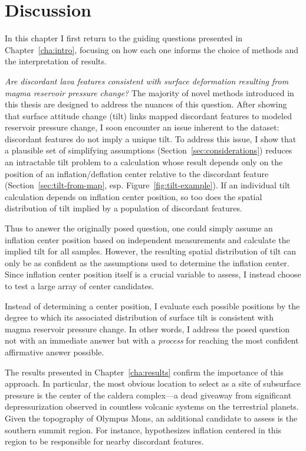 \chapter{Discussion}\label{cha:discussion}

In this chapter I first return to the guiding questions presented in Chapter~\ref{cha:intro}, focusing on how each one informs the choice of methods and the interpretation of results.

\emph{Are discordant lava features consistent with surface deformation resulting from magma reservoir pressure change?} The majority of novel methods introduced in this thesis are designed to address the nuances of this question. After showing that surface attitude change (tilt) links mapped discordant features to modeled reservoir pressure change, I soon encounter an issue inherent to the dataset: discordant features do not imply a unique tilt. To address this issue, I show that a plausible set of simplifying assumptions (Section~\ref{sec:considerations}) reduces an intractable tilt problem to a calculation whose result depends only on the position of an inflation/deflation center relative to the discordant feature (Section~\ref{sec:tilt-from-map}, esp. Figure~\ref{fig:tilt-example}). If an individual tilt calculation depends on inflation center position, so too does the spatial distribution of tilt implied by a population of discordant features.

Thus to answer the originally posed question, one could simply assume an inflation center position based on independent measurements and calculate the implied tilt for all samples. However, the resulting spatial distribution of tilt can only be as confident as the assumptions used to determine the inflation center. Since inflation center position itself is a crucial variable to assess, I instead choose to test a large array of center candidates. 

Instead of determining a center position, I evaluate each possible positions by the degree to which its associated distribution of surface tilt is consistent with magma reservoir pressure change. In other words, I address the posed question not with an immediate answer but with a \emph{process} for reaching the most confident affirmative answer possible.

The results presented in Chapter~\ref{cha:results} confirm the importance of this approach. In particular, the most obvious location to select as a site of subsurface pressure is the center of the caldera complex---a dead giveaway from significant depressurization observed in countless volcanic systems on the terrestrial planets. Given the topography of Olympus Mons, an additional candidate to assess is the southern summit region. For instance, \textcite{mouginis-mark_late-stage_2019} hypothesizes inflation centered in this region to be responsible for nearby discordant features.

